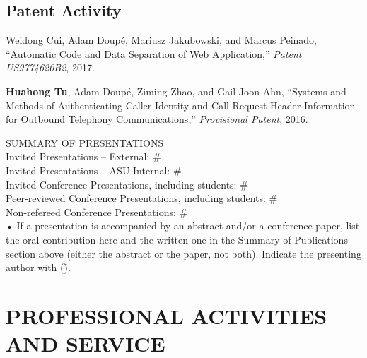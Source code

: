 \documentclass[11pt,letterpaper,sans]{moderncv}
\begin{document}
\subsection{Patent Activity}

\begin{etaremune}

  \item Weidong Cui, Adam Doup\'e, Mariusz Jakubowski, and Marcus
    Peinado, ``Automatic Code and Data Separation of Web
    Application,'' \emph{Patent US9774620B2}, 2017. 

  \item \textbf{Huahong Tu}, Adam Doup\'e, Ziming Zhao,
    and Gail-Joon Ahn, ``Systems and Methods of Authenticating Caller
    Identity and Call Request Header Information for Outbound
    Telephony Communications,'' \emph{Provisional Patent}, 2016.

  
\end{etaremune}




\begin{framed}
\underline{SUMMARY OF PRESENTATIONS} \\
Invited Presentations – External: \# \\
Invited Presentations – ASU Internal: \# \\
Invited Conference Presentations, including students: \# \\
Peer‐reviewed Conference Presentations, including students: \# \\
Non‐refereed Conference Presentations: \# \\
•	If a presentation is accompanied by an abstract and/or a conference paper, list the oral contribution here and the written one in the Summary of Publications section above (either the abstract or the paper, not both). Indicate the presenting author with (\~).

\end{framed}

\section{PROFESSIONAL ACTIVITIES AND SERVICE}
\end{document}
